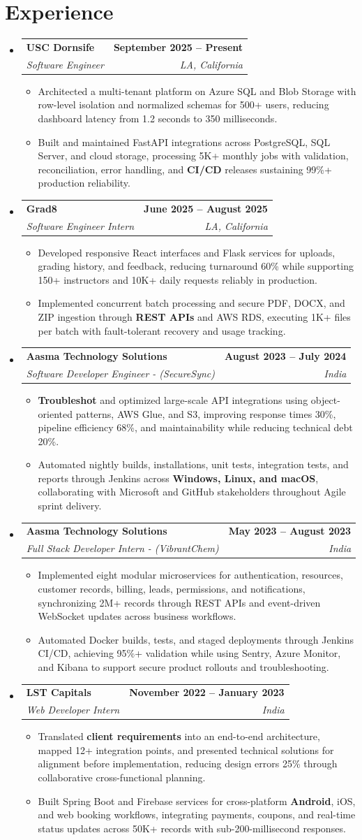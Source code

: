 \documentclass[letterpaper,10pt]{article}
\makeatletter
\newcommand{\itemTail}{\vspace{-6pt}}
\newcommand{\sectionGap}{\vspace{-8pt}}
\newcommand{\roleGap}{\vspace{0pt}}
\newcommand{\resumeItem}[1]{\item\small{{#1 \itemTail}}}
\newcommand{\resumeSubheading}[4]{\vspace{-1pt}\item\begin{tabular*}{1.0\textwidth}[t]{l@{\extracolsep{\fill}}r}\textbf{#1} & \textbf{\small #2} \\\textit{\small#3} & \textit{\small #4} \\\end{tabular*}\vspace{-2pt}}
\newcommand{\resumeSubHeadingListStart}{\begin{itemize}[leftmargin=0.0in, label={}]}
\newcommand{\resumeSubHeadingListEnd}{\end{itemize}}
\newcommand{\resumeItemListStart}{\begin{itemize}[leftmargin=0.15in,label=\textbullet,itemsep=6pt,topsep=0pt,parsep=0pt,partopsep=0pt]}
\newcommand{\resumeItemListEnd}{\end{itemize}\vspace{-4pt}}
\makeatother
\begin{document}
\section{Experience}
\resumeSubHeadingListStart
\resumeSubheading{USC Dornsife}{September 2025 -- Present}{Software Engineer}{LA, California}
\resumeItemListStart
\resumeItem{Architected a multi-tenant platform on Azure SQL and Blob Storage with row-level isolation and normalized schemas for 500+ users, reducing dashboard latency from 1.2 seconds to 350 milliseconds.}
\resumeItem{Built and maintained FastAPI integrations across PostgreSQL, SQL Server, and cloud storage, processing 5K+ monthly jobs with validation, reconciliation, error handling, and \textbf{CI/CD} releases sustaining 99\%+ production reliability.}
\resumeItemListEnd
\roleGap
\resumeSubheading{Grad8}{June 2025 -- August 2025}{Software Engineer Intern}{LA, California}
\resumeItemListStart
\resumeItem{Developed responsive React interfaces and Flask services for uploads, grading history, and feedback, reducing turnaround 60\% while supporting 150+ instructors and 10K+ daily requests reliably in production.}
\resumeItem{Implemented concurrent batch processing and secure PDF, DOCX, and ZIP ingestion through \textbf{REST APIs} and AWS RDS, executing 1K+ files per batch with fault-tolerant recovery and usage tracking.}
\resumeItemListEnd
\roleGap
\resumeSubheading{Aasma Technology Solutions}{August 2023 -- July 2024}{Software Developer Engineer - (SecureSync)}{India}
\resumeItemListStart
\resumeItem{\textbf{Troubleshot} and optimized large-scale API integrations using object-oriented patterns, AWS Glue, and S3, improving response times 30\%, pipeline efficiency 68\%, and maintainability while reducing technical debt 20\%.}
\resumeItem{Automated nightly builds, installations, unit tests, integration tests, and reports through Jenkins across \textbf{Windows, Linux, and macOS}, collaborating with Microsoft and GitHub stakeholders throughout Agile sprint delivery.}
\resumeItemListEnd
\roleGap
\resumeSubheading{Aasma Technology Solutions}{May 2023 -- August 2023}{Full Stack Developer Intern - (VibrantChem)}{India}
\resumeItemListStart
\resumeItem{Implemented eight modular microservices for authentication, resources, customer records, billing, leads, permissions, and notifications, synchronizing 2M+ records through REST APIs and event-driven WebSocket updates across business workflows.}
\resumeItem{Automated Docker builds, tests, and staged deployments through Jenkins CI/CD, achieving 95\%+ validation while using Sentry, Azure Monitor, and Kibana to support secure product rollouts and troubleshooting.}
\resumeItemListEnd
\roleGap
\resumeSubheading{LST Capitals}{November 2022 -- January 2023}{Web Developer Intern}{India}
\resumeItemListStart
\resumeItem{Translated \textbf{client requirements} into an end-to-end architecture, mapped 12+ integration points, and presented technical solutions for alignment before implementation, reducing design errors 25\% through collaborative cross-functional planning.}
\resumeItem{Built Spring Boot and Firebase services for cross-platform \textbf{Android}, iOS, and web booking workflows, integrating payments, coupons, and real-time status updates across 50K+ records with sub-200-millisecond responses.}
\resumeItemListEnd
\resumeSubHeadingListEnd
\sectionGap
\end{document}
